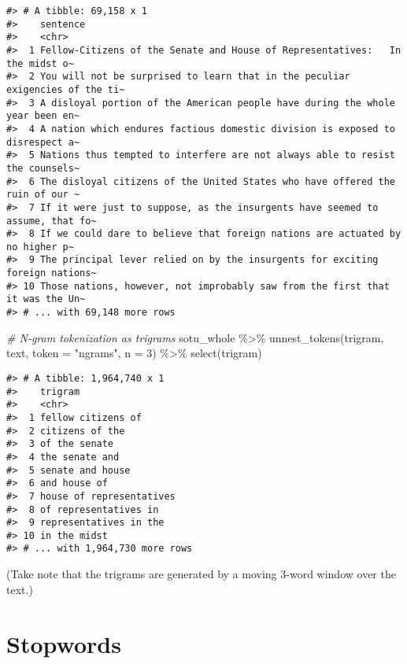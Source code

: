 \documentclass[
]{book}
\newenvironment{Shaded}{\begin{snugshade}}{\end{snugshade}}
\newcommand{\AttributeTok}[1]{\textcolor[rgb]{0.77,0.63,0.00}{#1}}
\newcommand{\CommentTok}[1]{\textcolor[rgb]{0.56,0.35,0.01}{\textit{#1}}}
\newcommand{\DecValTok}[1]{\textcolor[rgb]{0.00,0.00,0.81}{#1}}
\newcommand{\FunctionTok}[1]{\textcolor[rgb]{0.00,0.00,0.00}{#1}}
\newcommand{\NormalTok}[1]{#1}
\newcommand{\SpecialCharTok}[1]{\textcolor[rgb]{0.00,0.00,0.00}{#1}}
\newcommand{\StringTok}[1]{\textcolor[rgb]{0.31,0.60,0.02}{#1}}
\begin{document}
\begin{verbatim}
#> # A tibble: 69,158 x 1
#>    sentence                                                                     
#>    <chr>                                                                        
#>  1 Fellow-Citizens of the Senate and House of Representatives:   In the midst o~
#>  2 You will not be surprised to learn that in the peculiar exigencies of the ti~
#>  3 A disloyal portion of the American people have during the whole year been en~
#>  4 A nation which endures factious domestic division is exposed to disrespect a~
#>  5 Nations thus tempted to interfere are not always able to resist the counsels~
#>  6 The disloyal citizens of the United States who have offered the ruin of our ~
#>  7 If it were just to suppose, as the insurgents have seemed to assume, that fo~
#>  8 If we could dare to believe that foreign nations are actuated by no higher p~
#>  9 The principal lever relied on by the insurgents for exciting foreign nations~
#> 10 Those nations, however, not improbably saw from the first that it was the Un~
#> # ... with 69,148 more rows
\end{verbatim}

\begin{Shaded}
\begin{Highlighting}[]
\CommentTok{\# N{-}gram tokenization as trigrams}
\NormalTok{sotu\_whole }\SpecialCharTok{\%\textgreater{}\%}
  \FunctionTok{unnest\_tokens}\NormalTok{(trigram, text, }\AttributeTok{token =} \StringTok{"ngrams"}\NormalTok{, }\AttributeTok{n =} \DecValTok{3}\NormalTok{) }\SpecialCharTok{\%\textgreater{}\%} 
  \FunctionTok{select}\NormalTok{(trigram)}
\end{Highlighting}
\end{Shaded}

\begin{verbatim}
#> # A tibble: 1,964,740 x 1
#>    trigram                 
#>    <chr>                   
#>  1 fellow citizens of      
#>  2 citizens of the         
#>  3 of the senate           
#>  4 the senate and          
#>  5 senate and house        
#>  6 and house of            
#>  7 house of representatives
#>  8 of representatives in   
#>  9 representatives in the  
#> 10 in the midst            
#> # ... with 1,964,730 more rows
\end{verbatim}

(Take note that the trigrams are generated by a moving 3-word window over the text.)

\hypertarget{stopwords}{%
\section{Stopwords}\label{stopwords}}
\end{document}
